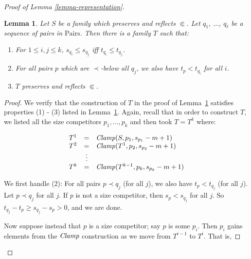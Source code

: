 \documentclass[letterpaper]{article}
\newtheorem{lemma}[theorem]{Lemma}
\theoremstyle{definition}
\newcommand{\Pairs}{\mbox{Pairs}}
\newcommand{\Clamp}{\protect{\mbox{\textit{Clamp}}}}
\newcommand{\precsubseteq}{\Subset}
\begin{document}
\begin{proof}[Proof of Lemma \ref{lemma-representation}]
\begin{lemma}

Let $S$ be a family which  preserves and reflects $\precsubseteq$.  
Let $q_1$, $\ldots$, $q_{\ell}$ be a sequence of pairs in $\Pairs$.  
Then there is a family $T$ such that:

\begin{enumerate} 
    \item For $1\leq i,j \leq k$, $s_{q_i} \leq s_{q_j}$ iff $t_{q_i} \leq t_{q_j}$. \label{competitor1}
    
    \item For all pairs $p $ which are $\prec$-below all $q_j$, we also have $t_{p}  <  t_{q_i}$ for all $i$. \label{competitor2}
  
    \item $T$ preserves and reflects $\precsubseteq$. 

\end{enumerate}

\label{lemma-sizeadjustment}
\end{lemma}
\begin{proof}
We verify that the construction of $T$ in the proof of Lemma~\ref{lemma-sizeadjustment} satisfies properties (1) - (3) listed in Lemma~\ref{lemma-sizeadjustment}.
Again, recall that in order to construct $T$, we listed all the size competitors $p_1, \ldots, p_k$ and then took $T = T^k$ where:

\[ \begin{array}{lcl}
 T^1  & = &  \Clamp(S,p_1,  s_{p_1} -m + 1)\\

T^2 & = & \Clamp(T^1,p_2,  s_{p_2}-m + 1 )\\
  & \vdots   & \\
T^{k} & = & \Clamp(T^{k-1},p_k, s_{p_k}-m + 1 )\\
\end{array}
\]

We first handle (2):  For all pairs $p \prec q_j$ (for all $j$), we also have $t_p < t_{q_j}$ (for all $j$).  Let $p \prec q_j$ for all $j$.  If $p$ is not a size competitor, then $s_p < s_{q_j}$ for all $j$.  So $t_{q_j} - t_p \ge s_{q_j} - s_p > 0$, and we are done.

Now suppose instead that $p$ is a size competitor; say $p$ is some $p_i$.  Then $p_i$ gains elements from the $\Clamp$ construction as we move from $T^{i-1}$ to $T^i$.  That is,


\end{proof}
\end{proof}
\end{document}
